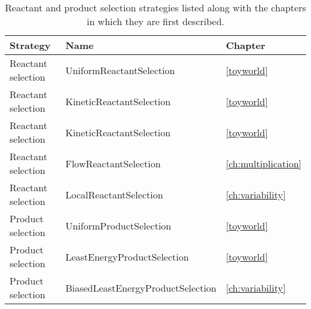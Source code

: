 \begin{table}
	\scriptsize
	\begin{center}
		\caption{Reactant and product selection strategies listed along with the chapters in which they are first described.}\label{tbl:toyworld-strategies}
		\begin{tabular}{p{4cm}p{4cm}p{5cm}}
			\toprule
			Strategy 			& Name & Chapter\\
			\midrule
			Reactant selection	& UniformReactantSelection	& \cref{toyworld}\\
			Reactant selection	& KineticReactantSelection	& \cref{toyworld}\\
			Reactant selection	& KineticReactantSelection	& \cref{toyworld}\\
			Reactant selection	& FlowReactantSelection		& \cref{ch:multiplication}\\
			Reactant selection	& LocalReactantSelection	& \cref{ch:variability}\\
			\midrule
			Product selection	& UniformProductSelection	& \cref{toyworld}\\
			Product selection	& LeastEnergyProductSelection	& \cref{toyworld}\\
			Product selection	& BiasedLeastEnergyProductSelection	& \cref{ch:variability}\\
			\bottomrule
		\end{tabular}
	\end{center}
\end{table}



